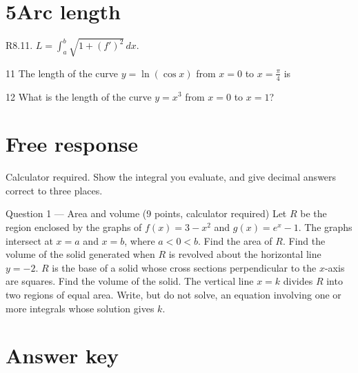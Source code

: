 \documentclass{apcalc}
\begin{document}
\section*{5\quad Arc length}
\begin{setrule}R8.11. $L=\int_a^b\sqrt{1+(f')^2}\,dx$.\end{setrule}
\begin{q}{11}
The length of the curve $y=\ln(\cos x)$ from $x=0$ to $x=\frac\pi4$ is
\end{q}
\begin{q}{12}
What is the length of the curve $y=x^3$ from $x=0$ to $x=1$?\calcmark
{}
\end{q}
\clearpage\section*{Free response}
Calculator required. Show the integral you evaluate, and give decimal answers correct to three places.
\begin{frq}{Question 1 --- Area and volume (9 points, calculator required)}
Let $R$ be the region enclosed by the graphs of $f(x)=3-x^2$ and $g(x)=e^x-1$. The graphs intersect at $x=a$ and $x=b$, where $a<0<b$.
Find the area of $R$.\workspace{1.6in}
Find the volume of the solid generated when $R$ is revolved about the horizontal line $y=-2$.\workspace{1.6in}
$R$ is the base of a solid whose cross sections perpendicular to the $x$-axis are squares. Find the volume of the solid.\workspace{1.6in}
The vertical line $x=k$ divides $R$ into two regions of equal area. Write, but do not solve, an equation involving one or more integrals whose solution gives $k$.\workspace{1.6in}
\end{frq}
\clearpage\section*{Answer key}
\vspace{4pt}
\end{document}
